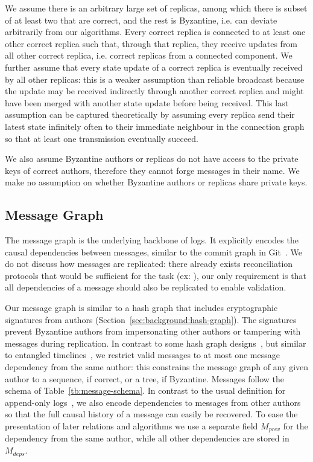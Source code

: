 \documentclass[9pt, oneside]{article}   	%
\begin{document}
We assume there is an arbitrary large set of replicas, among which there is subset of at least two that are correct, and the rest is Byzantine, i.e. can deviate arbitrarily from our algorithms. Every correct replica is connected to at least one other correct replica such that, through that replica, they receive updates from all other correct replica, i.e. correct replicas from a connected component. We further assume that every state update of a correct replica is eventually received by all other replicas: this is a weaker assumption than reliable broadcast because the update may be received indirectly through another correct replica and might have been merged with another state update before being received. This last assumption can be captured theoretically by assuming every replica send their latest state infinitely often to their immediate neighbour in the connection graph so that at least one transmission eventually succeed.

We also assume Byzantine authors or replicas do not have access to the private keys of correct authors, therefore they cannot forge messages in their name. We make no assumption on whether Byzantine authors or replicas share private keys.

\subsection{Message Graph}
\label{sec:design:message}

The message graph is the underlying backbone of logs. It explicitly encodes the causal dependencies between messages, similar to the commit graph in Git~\cite{git-commit}.  We do not discuss how messages are replicated: there already exists reconciliation protocols that would be sufficient for the task (ex: \cite{kleppmann2020bec}), our only requirement is that all dependencies of a message should also be replicated to enable validation.

Our message graph is similar to a hash graph that includes cryptographic signatures from authors (Section~\ref{sec:background:hash-graph}). The signatures prevent Byzantine authors from impersonating other authors or tampering with messages during replication. In contrast to some hash graph designs~\cite{kleppmann2020bec, Kleppmann2022byzantine, jacob2022bft-crdt}, but similar to entangled timelines~\cite{maniatis2002secure-timeline-entanglement}, we restrict valid messages to at most one message dependency from the same author: this constrains the message graph of any given author to a sequence, if correct, or a tree, if Byzantine. Messages follow the schema of Table~\ref{tb:message-schema}. In contrast to the usual definition for append-only logs~\cite{kermarrec2020gossiping}, we also encode dependencies to messages from other authors so that the full causal history of a message can easily be recovered. To ease the presentation of later relations and algorithms we use a separate field $M_\textit{prev}$ for the dependency from the same author, while all other dependencies are stored in $M_\textit{deps}$. 
\end{document}
